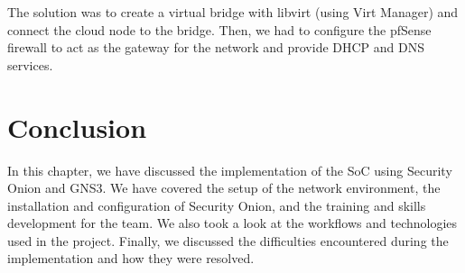 The solution was to create a virtual bridge with libvirt (using Virt Manager) and connect the cloud node to the bridge.
Then, we had to configure the pfSense firewall to act as the gateway for the network and provide DHCP and DNS services.

\setcounter{secnumdepth}{0} %
\section{Conclusion}
In this chapter, we have discussed the implementation of the SoC using Security Onion and GNS3.
We have covered the setup of the network environment, the installation and configuration of Security Onion, and the training and skills development for the team.
We also took a look at the workflows and technologies used in the project.
Finally, we discussed the difficulties encountered during the implementation and how they were resolved.
